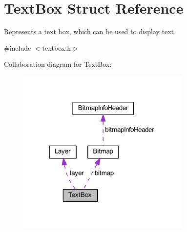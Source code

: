 \hypertarget{struct_text_box}{}\section{Text\+Box Struct Reference}
\label{struct_text_box}


Represents a text box, which can be used to display text.  




{\ttfamily \#include $<$textbox.\+h$>$}



Collaboration diagram for Text\+Box\+:\nopagebreak
\begin{figure}[H]
\begin{center}
\leavevmode
\includegraphics[width=242pt]{struct_text_box__coll__graph}
\end{center}
\end{figure}
